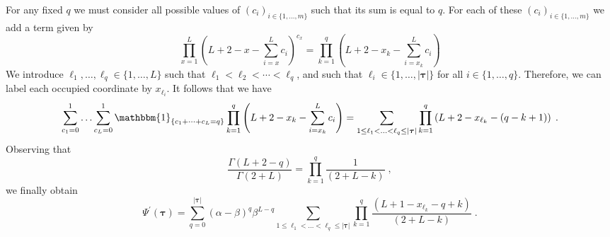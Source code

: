 \documentclass[10pt]{article}
\numberwithin{equation}{section}
\numberwithin{equation}{subsection}
\newcommand{\co}{\;,}
\newcommand{\dt}{\;.}
\begin{document}
For any fixed $q$ we must consider all possible values of $(c_{i})_{i\in\{1,\ldots,m\}}$ such that its sum is equal to $q$. For each of these $(c_{i})_{i\in\{1,\ldots,m\}}$ we add a term given by  
\begin{equation}
	\prod_{x=1}^{L}\left(L+2-x-\sum_{i=x}^{L}c_{i}\right)^{c_{x}}=\prod_{k=1}^{q}\left(L+2-x_{k}-\sum_{i=x_{k}}^{L}c_{i}\right)
\end{equation}
We introduce $\ell_{1},\ldots,\ell_{q}\in\{1,\ldots,L\}$ such that $\ell_{1}<\ell_{2}<\cdots<\ell_{q}$, and such that $\ell_{i}\in\{1,\ldots,|\bm{\tau}|\}$ for all $i\in\{1,\ldots,q\}$. Therefore, we can label each occupied coordinate by $x_{\ell_{i}}$. It follows that we have
\begin{equation}
	\sum_{c_{1}=0}^{1}\ldots\sum_{c_{L}=0}^{1}\mathbbm{1}_{\{c_{1}+\cdots+c_{L}=q\}}\prod_{k=1}^{q}\left(L+2-x_{k}-\sum_{i=x_{k}}^{L}c_{i}\right)=\sum_{1\leq \ell_{1}<\ldots<\ell_{q}\leq |\bm{\tau}|}\prod_{k=1}^{q}\left(L+2-x_{\ell_{k}}-(q-k+1)\right)\dt
\end{equation} 
Observing that
\begin{equation}
	\frac{\Gamma(L+2-q)}{\Gamma(2+L)}=\prod_{k=1}^{q}\frac{1}{(2+L-k)}\co
\end{equation}
we finally obtain 
\begin{equation}\label{PsiI-N2}
	\Psi^{'}(\bm{\tau})=\sum_{q=0}^{|\bm{\tau}|}(\alpha-\beta)^{q}\beta^{L-q}\sum_{1\leq \ell_{1}<\ldots<\ell_{q}\leq |\bm{\tau}|}\prod_{k=1}^{q}\frac{\left(L+1-x_{\ell_{k}}-q+k\right)}{(2+L-k)}\dt
\end{equation}
\end{document}
